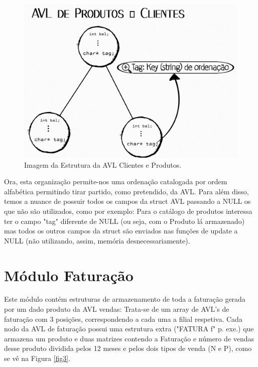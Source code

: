 \documentclass[a4paper,11pt]{report}
\begin{document}
\begin{figure}[H]
  \centering
  \includegraphics[scale=0.15]{Avl_Prod_Cli.png}
  \caption{Imagem da Estrutura da AVL Clientes e Produtos.}
  \label{fig2}
\end{figure}



Ora, esta organização permite-nos uma ordenação catalogada por ordem alfabética permitindo tirar partido, como pretendido, da AVL. Para além disso, temos a nuance de possuir todos os campos da struct AVL passando a NULL os que não são utilizados, como por exemplo: Para o catálogo de produtos interessa ter o campo "tag" diferente de NULL (ou seja, com o Produto lá armazenado) mas todos os outros campos da struct são enviados nas funções de update a NULL (não utilizando, assim, memória desnecessariamente).

\section{Módulo Faturação}
\quad Este módulo contém estruturas de armazenamento de toda a faturação gerada por um dado produto da AVL vendas: Trata-se de um array de AVL's de faturação com 3 posições, correspondendo a cada uma a filial respetiva. Cada nodo da AVL de faturação possui uma estrutura extra ("FATURA f" p. exe.) que armazena um produto e duas matrizes contendo a Faturação e número de vendas desse produto dividida pelos 12 meses e pelos dois tipos de venda (N e P), como se vê na Figura \ref{fig3}.
\end{document}
